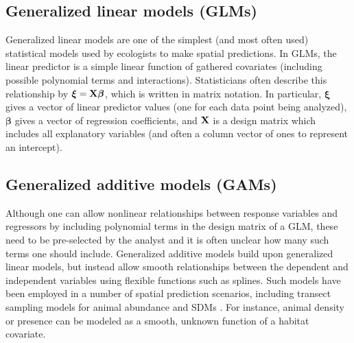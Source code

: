 \documentclass[12pt,fleqn]{article}
\begin{document}
\begin{flushleft}
\subsection{Generalized linear models (GLMs)}

Generalized linear models \citep{McCullaghNelder1989} are one of the simplest (and most often used) statistical models
used by ecologists to make spatial predictions. In GLMs, the linear predictor is a simple linear function of gathered covariates
(including possible polynomial terms and interactions).  Statisticians often describe this relationship by
$\boldsymbol{\xi}={\bf X} \boldsymbol{\beta}$, which is written in matrix notation.  In particular, $\boldsymbol{\xi}$ gives
a vector of linear predictor values (one for each data point being analyzed), $\boldsymbol{\beta}$ gives a vector of regression coefficients, and ${\bf X}$ is a design matrix which includes all explanatory variables (and often a column vector of ones to represent an intercept).

\subsection{Generalized additive models (GAMs)}

Although one can allow nonlinear relationships between response variables and regressors by including polynomial terms in the design matrix of a GLM, these need to be pre-selected by the analyst and it is often unclear how many such terms one should include. Generalized additive models \citep[GAMs;][]{HastieTibshirani1999,Wood2006} build upon generalized linear models, but instead allow smooth relationships between the dependent and independent variables using flexible functions such as splines.  Such models have
been employed in a number of spatial prediction scenarios, including transect sampling models for animal abundance \citep{HedleyBuckland2004} and SDMs \citep{GuisanEtAl2002}.  For instance, animal density or presence can be modeled as a smooth, unknown function of a habitat covariate.


\end{flushleft}
\end{document}

